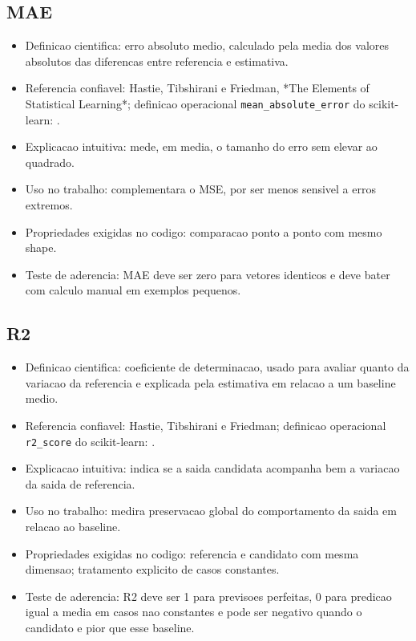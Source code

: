 \subsection{MAE}


\begin{itemize}
\item Definicao cientifica: erro absoluto medio, calculado pela media dos valores
absolutos das diferencas entre referencia e estimativa.
\item Referencia confiavel: Hastie, Tibshirani e Friedman, *The Elements of
Statistical Learning*; definicao operacional \texttt{mean\_\allowbreak{}absolute\_\allowbreak{}error} do
scikit-learn:
.
\item Explicacao intuitiva: mede, em media, o tamanho do erro sem elevar ao
quadrado.
\item Uso no trabalho: complementara o MSE, por ser menos sensivel a erros extremos.
\item Propriedades exigidas no codigo: comparacao ponto a ponto com mesmo shape.
\item Teste de aderencia: MAE deve ser zero para vetores identicos e deve bater com
calculo manual em exemplos pequenos.
\end{itemize}


\subsection{R2}


\begin{itemize}
\item Definicao cientifica: coeficiente de determinacao, usado para avaliar quanto
da variacao da referencia e explicada pela estimativa em relacao a um baseline
medio.
\item Referencia confiavel: Hastie, Tibshirani e Friedman; definicao operacional
\texttt{r2\_\allowbreak{}score} do scikit-learn:
.
\item Explicacao intuitiva: indica se a saida candidata acompanha bem a variacao da
saida de referencia.
\item Uso no trabalho: medira preservacao global do comportamento da saida em
relacao ao baseline.
\item Propriedades exigidas no codigo: referencia e candidato com mesma dimensao;
tratamento explicito de casos constantes.
\item Teste de aderencia: R2 deve ser 1 para previsoes perfeitas, 0 para predicao
igual a media em casos nao constantes e pode ser negativo quando o candidato e
pior que esse baseline.
\end{itemize}


